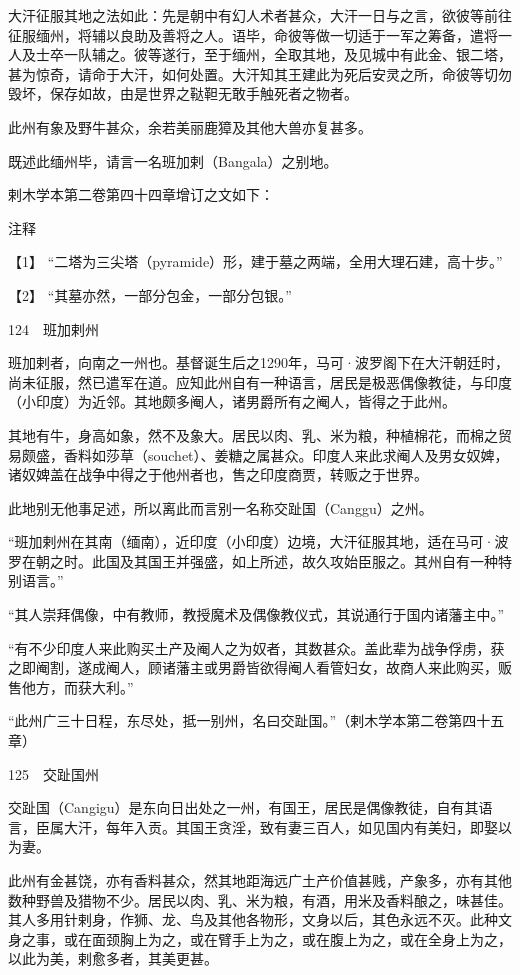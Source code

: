 \documentclass[12pt,UTF8]{ctexbook}
\begin{document}
大汗征服其地之法如此：先是朝中有幻人术者甚众，大汗一日与之言，欲彼等前往征服缅州，将辅以良助及善将之人。语毕，命彼等做一切适于一军之筹备，遣将一人及士卒一队辅之。彼等遂行，至于缅州，全取其地，及见城中有此金、银二塔，甚为惊奇，请命于大汗，如何处置。大汗知其王建此为死后安灵之所，命彼等切勿毁坏，保存如故，由是世界之鞑靼无敢手触死者之物者。

此州有象及野牛甚众，余若美丽鹿獐及其他大兽亦复甚多。

既述此缅州毕，请言一名班加剌（Bangala）之别地。

剌木学本第二卷第四十四章增订之文如下：

注释

【1】 “二塔为三尖塔（pyramide）形，建于墓之两端，全用大理石建，高十步。”

【2】 “其墓亦然，一部分包金，一部分包银。”





124　班加剌州

班加剌者，向南之一州也。基督诞生后之1290年，马可·波罗阁下在大汗朝廷时，尚未征服，然已遣军在道。应知此州自有一种语言，居民是极恶偶像教徒，与印度（小印度）为近邻。其地颇多阉人，诸男爵所有之阉人，皆得之于此州。

其地有牛，身高如象，然不及象大。居民以肉、乳、米为粮，种植棉花，而棉之贸易颇盛，香料如莎草（souchet）、姜糖之属甚众。印度人来此求阉人及男女奴婢，诸奴婢盖在战争中得之于他州者也，售之印度商贾，转贩之于世界。

此地别无他事足述，所以离此而言别一名称交趾国（Canggu）之州。

“班加剌州在其南（缅南），近印度（小印度）边境，大汗征服其地，适在马可·波罗在朝之时。此国及其国王并强盛，如上所述，故久攻始臣服之。其州自有一种特别语言。”

“其人崇拜偶像，中有教师，教授魔术及偶像教仪式，其说通行于国内诸藩主中。”

“有不少印度人来此购买土产及阉人之为奴者，其数甚众。盖此辈为战争俘虏，获之即阉割，遂成阉人，顾诸藩主或男爵皆欲得阉人看管妇女，故商人来此购买，贩售他方，而获大利。”

“此州广三十日程，东尽处，抵一别州，名曰交趾国。”（剌木学本第二卷第四十五章）





125　交趾国州

交趾国（Cangigu）是东向日出处之一州，有国王，居民是偶像教徒，自有其语言，臣属大汗，每年入贡。其国王贪淫，致有妻三百人，如见国内有美妇，即娶以为妻。

此州有金甚饶，亦有香料甚众，然其地距海远广土产价值甚贱，产象多，亦有其他数种野兽及猎物不少。居民以肉、乳、米为粮，有酒，用米及香料酿之，味甚佳。其人多用针剌身，作狮、龙、鸟及其他各物形，文身以后，其色永远不灭。此种文身之事，或在面颈胸上为之，或在臂手上为之，或在腹上为之，或在全身上为之，以此为美，剌愈多者，其美更甚。
\end{document}
